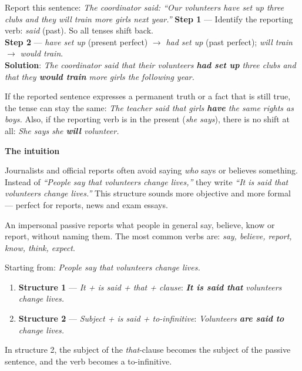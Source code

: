 \documentclass[11pt]{article}
\newcommand{\cle}[1]{{\popxbold\color{popdark}#1}}
\newcounter{popsec}
\newcounter{popsub}
\newcommand{\courssub}[1]{%
  \stepcounter{popsub}%
  \par\vspace{9pt}\noindent{\popxbold\fontsize{11.5}{13}\selectfont\color{popink}{\color{poporange}\thepopsec.\thepopsub}\hspace{6pt}#1}\par\nopagebreak\vspace{4pt}
}
\begin{document}
\begin{exoresolu}
Report this sentence: \emph{The coordinator said: ``Our volunteers have set up three clubs and they will train more girls next year.''}
\tcblower
\textbf{Step 1} — Identify the reporting verb: \emph{said} (past). So all tenses shift back.\\
\textbf{Step 2} — \emph{have set up} (present perfect) $\rightarrow$ \emph{had set up} (past perfect); \emph{will train} $\rightarrow$ \emph{would train}.\\
\textbf{Solution}: \emph{The coordinator said that their volunteers \textbf{had set up} three clubs and that they \textbf{would train} more girls the following year.}
\end{exoresolu}

\begin{attention}
If the reported sentence expresses a permanent truth or a fact that is still true, the tense can stay the same: \emph{The teacher said that girls \textbf{have} the same rights as boys.} Also, if the reporting verb is in the present (\emph{she says}), there is no shift at all: \emph{She says she \textbf{will} volunteer.}
\end{attention}

\courssub{Impersonal passives}

\textbf{The intuition}\par

Journalists and official reports often avoid saying \emph{who} says or believes something. Instead of \emph{``People say that volunteers change lives,''} they write \emph{``It is said that volunteers change lives.''} This structure sounds more objective and more formal — perfect for reports, news and exam essays.

\begin{definition}
An \cle{impersonal passive} reports what people in general say, believe, know or report, without naming them. The most common verbs are: \emph{say, believe, report, know, think, expect}.
\end{definition}

\begin{methode}
Starting from: \emph{People say that volunteers change lives.}
\begin{enumerate}
\item \textbf{Structure 1} — \emph{It + is said + that + clause}: \emph{\textbf{It is said that} volunteers change lives.}
\item \textbf{Structure 2} — \emph{Subject + is said + to-infinitive}: \emph{Volunteers \textbf{are said to} change lives.}
\end{enumerate}
In structure 2, the subject of the \emph{that}-clause becomes the subject of the passive sentence, and the verb becomes a to-infinitive.
\end{methode}
\end{document}
